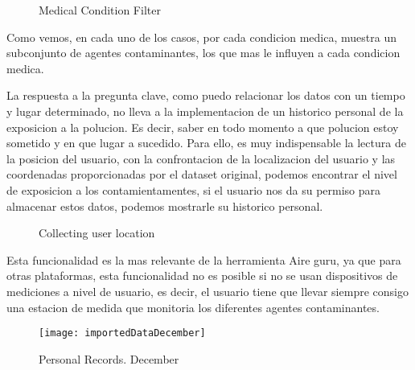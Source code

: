 \begin{figure}[ht]
    \centering
    \hfill
    \hfill
  
  \caption{Medical Condition Filter}
    \end{figure}
 Como vemos, en cada uno de los casos, por cada condicion medica, muestra un subconjunto de agentes contaminantes,
 los que mas le influyen a cada condicion medica.

La respuesta a la pregunta clave, como puedo relacionar los datos con un tiempo y lugar determinado, no lleva a la
implementacion de un historico personal de la exposicion a la polucion. Es decir, saber en todo momento a que polucion
estoy sometido y en que lugar a sucedido.
Para ello, es muy indispensable la lectura de la posicion del usuario, con la confrontacion de la localizacion del 
usuario y las coordenadas proporcionadas por el dataset original, podemos encontrar el nivel de exposicion a los contamientamentes,
si el usuario nos da su permiso para almacenar estos datos, podemos mostrarle su historico personal.
\begin{figure}[ht]
   \centering 
     \caption{Collecting user location}
   \end{figure}


Esta funcionalidad es la mas relevante de la herramienta Aire guru, ya que para otras plataformas, esta funcionalidad no es
posible si no se usan dispositivos de mediciones a nivel de usuario, es decir, el usuario tiene que llevar siempre consigo 
una estacion de medida que monitoria los diferentes agentes contaminantes.\\

\begin{figure}[ht]
    \centering
    \texttt{[image: importedDataDecember]}
    \caption{Personal Records. December}
\end{figure}

